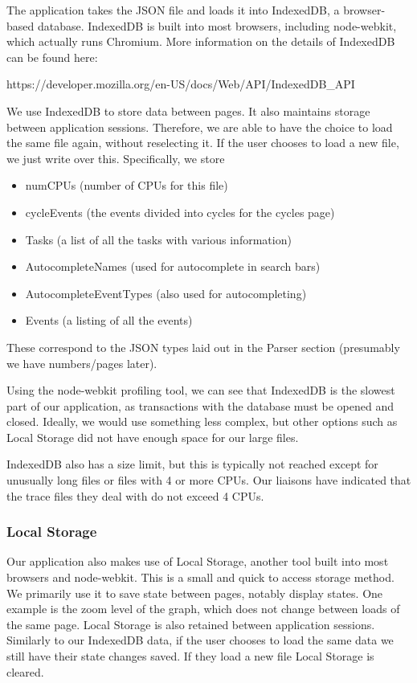 \documentclass{hmcclinic}
\begin{document}
  The application takes the JSON file and loads it into IndexedDB, a
  browser-based database. IndexedDB is built into most browsers, including
  node-webkit, which actually runs Chromium. More information on the details of IndexedDB can be found here:
\begin{center}
  https://developer.mozilla.org/en-US/docs/Web/API/IndexedDB\_API
\end{center}
  We use IndexedDB to store data between pages. It also
  maintains storage between application sessions. Therefore, we are able to have
  the choice to load the same file again, without reselecting it. If the user
  chooses to load a new file, we just write over this.
  Specifically, we store 
  \begin{itemize}
    \item numCPUs (number of CPUs for this file)
    \item cycleEvents (the events divided into cycles for the cycles page)
    \item Tasks (a list of all the tasks with various information)
    \item AutocompleteNames (used for autocomplete in search bars)
    \item AutocompleteEventTypes (also used for autocompleting)
    \item Events (a listing of all the events)
  \end{itemize}
  These correspond to the JSON types laid
  out in the Parser section (presumably we have numbers/pages later).

  Using the node-webkit profiling tool, we can see that IndexedDB is the slowest
  part of our application, as transactions with the database must be opened and
  closed. Ideally, we would use something less complex, but other options such
  as Local Storage did not have enough space for our large files.

  IndexedDB also has  a size limit, but this is typically not reached except for
  unusually long files or files with 4 or more CPUs. Our liaisons have indicated
  that the trace files they deal with do not exceed 4 CPUs.

  \subsubsection{Local Storage}

  Our application also makes use of Local Storage, another tool
  built into most browsers and node-webkit. This is a small and quick to access
  storage method. We primarily use it to save state between pages, notably
  display states. One example is the zoom level of the graph, which does not
  change between loads of the same page. Local Storage is also retained between
  application sessions. Similarly to our IndexedDB data, if the user chooses to
  load the same data we still have their state changes saved. If they load a new
  file Local Storage is cleared.
\end{document}
